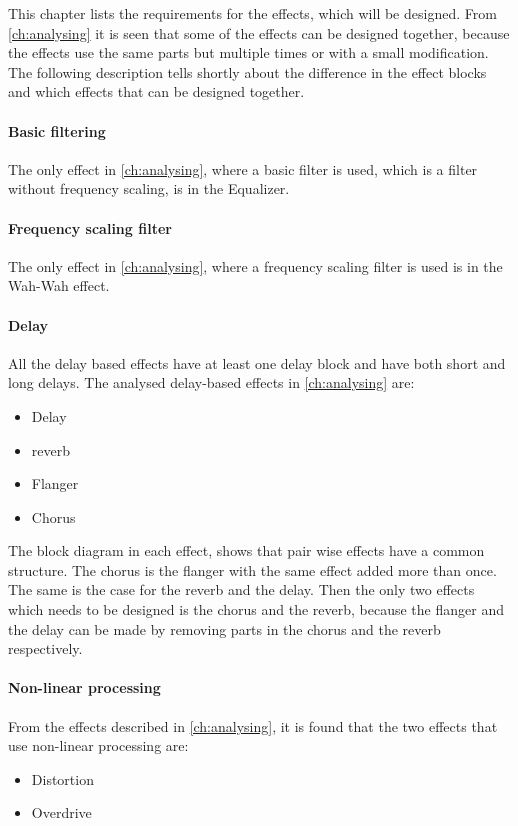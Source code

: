 This chapter lists the requirements for the effects, which will be designed. From \autoref{ch:analysing} it is seen that some of the effects can be designed together, because the effects use the same parts but multiple times or with a small modification. The following description tells shortly about the difference in the effect blocks and which effects that can be designed together.

\paragraph*{Basic filtering}
The only effect in \autoref{ch:analysing}, where a basic filter is used, which is a filter without frequency scaling, is in the Equalizer.

\paragraph{Frequency scaling filter}
The only effect in \autoref{ch:analysing}, where a frequency scaling filter is used is in the Wah-Wah effect.

\paragraph{Delay}
All the delay based effects have at least one delay block and have both short and long delays. The analysed delay-based effects in \autoref{ch:analysing} are:
\begin{itemize}
	\item Delay
	\item \gls{reverb}
	\item Flanger
	\item Chorus
\end{itemize} 

The block diagram in each effect, shows that pair wise effects have a common structure. The chorus is the flanger with the same effect added more than once. The same is the case for the \gls{reverb} and the delay. Then the only two effects which needs to be designed is the chorus and the \gls{reverb}, because the flanger and the delay can be made by removing parts in the chorus and the \gls{reverb} respectively.

\paragraph{Non-linear processing}
From the effects described in \autoref{ch:analysing}, it is found that the two effects that use non-linear processing are:
\begin{itemize}
	\item Distortion
	\item Overdrive
\end{itemize} 

